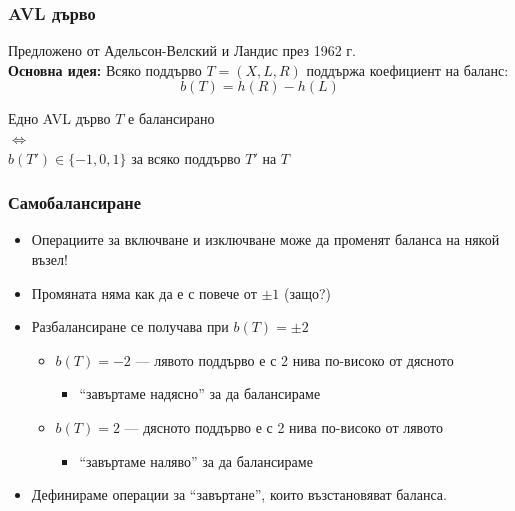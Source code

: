 \documentclass[alsotrans]{beamerswitch}
\begin{document}
\begin{frame}
  \frametitle{AVL дърво}
  Предложено от Адельсон-Велский и Ландис през 1962 г.\\[2ex]
  \textbf{Основна идея:} Всяко поддърво $T = (X,L,R)$ поддържа коефициент на баланс:
  \begin{equation*}
    b(T) = h(R) - h(L)
  \end{equation*}
  \pause
  \begin{block}{}
    \begin{center}
      Едно AVL дърво $T$ е балансирано\\
      $\Longleftrightarrow$\\
      $b(T') \in \{-1,0,1\}$ за всяко поддърво $T'$ на $T$
    \end{center}
  \end{block}
\end{frame}

\begin{frame}
  \frametitle{Самобалансиране}
  \begin{itemize}[<+->]
  \item Операциите за включване и изключване може да променят баланса на някой възел!
  \item Промяната няма как да е с повече от $\pm 1$ (защо?)
  \item Разбалансиране се получава при $b(T) = \pm 2$
    \begin{itemize}
    \item $b(T) = -2$ --- лявото поддърво е с 2 нива по-високо от дясното
      \begin{itemize}
      \item<7-> ``завъртаме надясно'' за да балансираме
      \end{itemize}
    \item $b(T) = 2$ --- дясното поддърво е с 2 нива по-високо от лявото
      \begin{itemize}
      \item<8-> ``завъртаме наляво'' за да балансираме
      \end{itemize}
    \end{itemize}
  \item
    Дефинираме операции за ``завъртане'', които възстановяват баланса.
  \end{itemize}
\end{frame}
\end{document}
